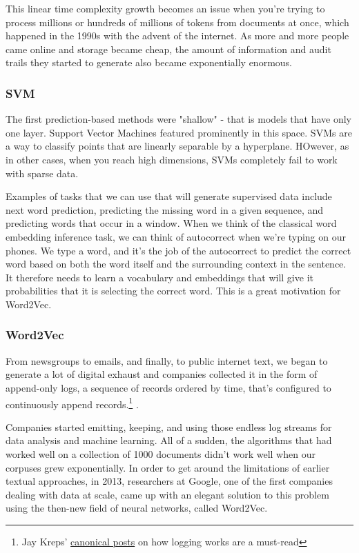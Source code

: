 \documentclass[11pt]{diazessay} %
\begin{document}
This linear time complexity growth becomes an issue when you're trying to process millions or hundreds of millions of tokens from documents at once, which happened in the 1990s with the advent of the internet.  As more and more people came online and storage became cheap, the amount of information and audit trails they started to generate also became exponentially enormous.  
\subsubsection{SVM}
The first prediction-based methods were "shallow" - that is models that have only one layer\citep{collobert2008unified}. Support Vector Machines featured prominently in this space. SVMs are a way to classify points that are linearly separable by a hyperplane. HOwever, as in other cases, when you reach high dimensions, SVMs completely fail to work with sparse data. 

Examples of tasks that we can use that will generate supervised data include next word prediction, predicting the missing word in a given sequence, and predicting words that occur in a window. When we think of the classical word embedding inference task, we can think of autocorrect when we're typing on our phones. We type a word, and it's the job of the autocorrect to predict the correct word based on both the word itself and the surrounding context in the sentence. It therefore needs to learn a vocabulary and embeddings that will give it probabilities that it is selecting the correct word. This is a great motivation for Word2Vec. 

\subsubsection{Word2Vec}

From newsgroups to emails, and finally, to public internet text, we began to generate a lot of digital exhaust and companies collected it in the form of append-only logs\citep{kreps2014heart}, a sequence of records ordered by time, that's configured to continuously append records.\footnote{Jay Kreps' \href{https://engineering.linkedin.com/distributed-systems/log-what-every-software-engineer-should-know-about-real-time-datas-unifying}{canonical posts} on how logging works are a must-read} . 

Companies started emitting, keeping, and using those endless log streams for data analysis and machine learning. All of a sudden, the algorithms that had worked well on a collection of 1000 documents didn't work well when our corpuses grew exponentially. In order to get around the limitations of earlier textual approaches, in 2013, researchers at Google, one of the first companies dealing with data at scale, came up with an elegant solution to this problem using the then-new field of neural networks, called Word2Vec\citep{mikolov2013efficient}.  
\end{document}
